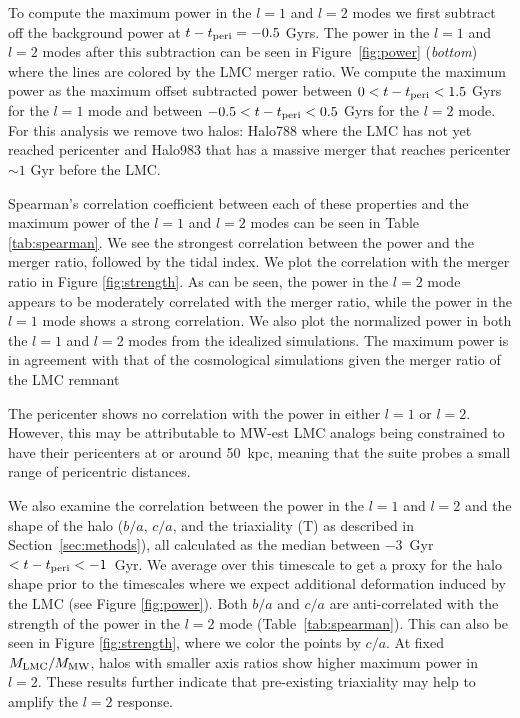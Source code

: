 \documentclass[twocolumn, linenumbers]{openjournal}
\begin{document}
To compute the maximum power in the $l=1$ and $l=2$ modes we first subtract off the background 
power at $t-t_{\rm peri}=-0.5$ Gyrs. The power in the $l=1$ and $l=2$ modes after this subtraction 
can be seen in Figure~\ref{fig:power} (\emph{bottom}) where the lines are colored by the LMC merger 
ratio. We compute the maximum power as the maximum offset subtracted power between 
$0 < t-t_{\rm peri} < 1.5$ Gyrs for the $l=1$ mode and between $-0.5 < t-t_{\rm peri} < 0.5$ Gyrs 
for the $l=2$ mode. For this analysis we remove two halos: Halo788 where the LMC has not yet 
reached pericenter and Halo983 that has a massive merger that reaches pericenter $\sim 1$ Gyr 
before the LMC. 

Spearman's correlation coefficient between each of these properties and the maximum power of the 
$l=1$ and $l=2$ modes can be seen in Table \ref{tab:spearman}. We see the strongest correlation 
between the power and the merger ratio, followed by the tidal index. We plot the correlation with 
the merger ratio in Figure \ref{fig:strength}. As can be seen, the power in the $l=2$ mode appears 
to be moderately correlated with the merger ratio, while the power in the $l=1$ mode shows a 
strong correlation. We also plot the normalized power in both the $l=1$ and $l=2$ modes from the 
idealized simulations. The maximum power is in agreement with that of the cosmological simulations 
given the merger ratio of the LMC remnant \citep[$M_{\rm LMC}/M_{\rm MW} = 0.12$;][]{garavito_19}

The pericenter shows no correlation with the power in either $l=1$ or $l=2$. However, this may be 
attributable to MW-est LMC analogs being constrained to have their pericenters at or around 50~kpc, 
meaning that the suite probes a small range of pericentric distances.

We also examine the correlation between the power in the $l=1$ and $l=2$ and the shape of the 
halo ($b/a$, $c/a$, and the triaxiality (T) as described in Section~\ref{sec:methods}), all 
calculated as the median between $-3\,$ Gyr $< t-t_{\rm peri} < -1\,$ Gyr. We average over this 
timescale to get a proxy for the halo shape prior to the timescales where we expect additional 
deformation induced by the LMC (see Figure \ref{fig:power}). %
Both $b/a$ and $c/a$ are anti-correlated with the strength of the power in the $l=2$ mode 
(Table~\ref{tab:spearman}). This can also be seen in Figure \ref{fig:strength}, where we color the 
points by $c/a$. At fixed $M_{\rm LMC}/M_{\rm MW}$, halos with smaller axis ratios show higher 
maximum power in $l=2$. These results further indicate that pre-existing triaxiality may help to 
amplify the $l=2$ response. 
\end{document}
